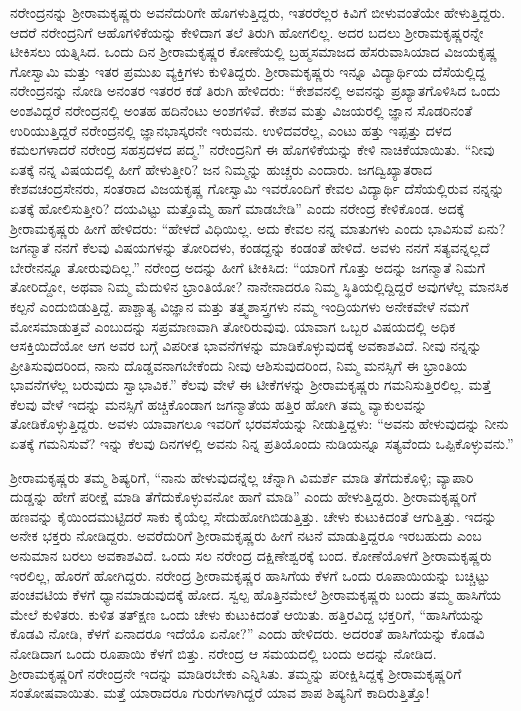 ನರೇಂದ್ರನನ್ನು ಶ‍್ರೀರಾಮಕೃಷ್ಣರು ಅವನೆದುರಿಗೇ ಹೊಗಳುತ್ತಿದ್ದರು, ಇತರರೆಲ್ಲರ ಕಿವಿಗೆ ಬೀಳುವಂತೆಯೇ ಹೇಳುತ್ತಿದ್ದರು. ಆದರೆ ನರೇಂದ್ರನಿಗೆ ಆ\break ಹೊಗಳಿಕೆಯನ್ನು ಕೇಳಿದಾಗ ತಲೆ ತಿರುಗಿ ಹೋಗಲಿಲ್ಲ. ಅದರ ಬದಲು ಶ‍್ರೀರಾಮಕೃಷ್ಣ\-ರನ್ನೇ ಟೀಕಿಸಲು ಯತ್ನಿಸಿದ. ಒಂದು ದಿನ ಶ‍್ರೀರಾಮಕೃಷ್ಣರ ಕೋಣೆಯಲ್ಲಿ ಬ್ರಹ್ಮಸಮಾಜದ ಹೆಸರುವಾಸಿಯಾದ ವಿಜಯಕೃಷ್ಣ ಗೋಸ್ವಾಮಿ ಮತ್ತು ಇತರ ಪ್ರಮುಖ ವ್ಯಕ್ತಿಗಳು ಕುಳಿತಿದ್ದರು. ಶ‍್ರೀರಾಮಕೃಷ್ಣರು ಇನ್ನೂ ವಿದ್ಯಾರ್ಥಿಯ ದೆಸೆಯಲ್ಲಿದ್ದ ನರೇಂದ್ರನನ್ನು ನೋಡಿ ಅನಂತರ ಇತರರ ಕಡೆ ತಿರುಗಿ ಹೇಳಿದರು: “ಕೇಶವನಲ್ಲಿ ಅವನನ್ನು ಪ್ರಖ್ಯಾತಗೊಳಿಸಿದ ಒಂದು ಅಂಶವಿದ್ದರೆ ನರೇಂದ್ರನಲ್ಲಿ ಅಂತಹ ಹದಿನೆಂಟು ಅಂಶಗಳಿವೆ. ಕೇಶವ ಮತ್ತು ವಿಜಯರಲ್ಲಿ ಜ್ಞಾನ ಸೊಡರಿನಂತೆ ಉರಿಯುತ್ತಿದ್ದರೆ ನರೇಂದ್ರನಲ್ಲಿ ಜ್ಞಾನಭಾಸ್ಕರನೇ ಇರುವನು. ಉಳಿದವರೆಲ್ಲ, ಎಂಟು ಹತ್ತು ಇಪ್ಪತ್ತು ದಳದ ಕಮಲಗಳಾದರೆ ನರೇಂದ್ರ ಸಹಸ್ರದಳದ ಪದ್ಮ.” ನರೇಂದ್ರನಿಗೆ ಈ ಹೊಗಳಿಕೆಯನ್ನು ಕೇಳಿ ನಾಚಿಕೆಯಾಯಿತು. “ನೀವು ಏತಕ್ಕೆ ನನ್ನ ವಿಷಯದಲ್ಲಿ ಹೀಗೆ ಹೇಳುತ್ತೀರಿ? ಜನ ನಿಮ್ಮನ್ನು ಹುಚ್ಚರು ಎಂದಾರು. ಜಗದ್ವಿಖ್ಯಾತರಾದ ಕೇಶವಚಂದ್ರಸೇನರು, ಸಂತರಾದ ವಿಜಯಕೃಷ್ಣ ಗೋಸ್ವಾಮಿ ಇವರೊಂದಿಗೆ ಕೇವಲ ವಿದ್ಯಾರ್ಥಿ ದೆಸೆಯಲ್ಲಿರುವ ನನ್ನನ್ನು ಏತಕ್ಕೆ ಹೋಲಿಸುತ್ತೀರಿ? ದಯವಿಟ್ಟು ಮತ್ತೊಮ್ಮೆ ಹಾಗೆ ಮಾಡಬೇಡಿ” ಎಂದು ನರೇಂದ್ರ ಕೇಳಿಕೊಂಡ. ಅದಕ್ಕೆ ಶ‍್ರೀರಾಮಕೃಷ್ಣರು ಹೀಗೆ ಹೇಳಿದರು: “ಹೇಳದೆ ವಿಧಿಯಿಲ್ಲ. ಅದು ಕೇವಲ ನನ್ನ ಮಾತುಗಳು ಎಂದು ಭಾವಿಸುವೆ ಏನು? ಜಗನ್ಮಾತೆ ನನಗೆ ಕೆಲವು ವಿಷಯಗಳನ್ನು ತೋರಿದಳು, ಕಂಡದ್ದನ್ನು ಕಂಡಂತೆ ಹೇಳಿದೆ. ಅವಳು ನನಗೆ ಸತ್ಯವನ್ನಲ್ಲದೆ ಬೇರೇನನ್ನೂ ತೋರುವುದಿಲ್ಲ.” ನರೇಂದ್ರ ಅದನ್ನು ಹೀಗೆ ಟೀಕಿಸಿದ: “ಯಾರಿಗೆ ಗೊತ್ತು ಅದನ್ನು ಜಗನ್ಮಾತೆ ನಿಮಗೆ ತೋರಿದ್ದೋ, ಅಥವಾ ನಿಮ್ಮ ಮೆದುಳಿನ ಭ್ರಾಂತಿಯೋ? ನಾನೇನಾದರೂ ನಿಮ್ಮ ಸ್ಥಿತಿಯಲ್ಲಿದ್ದಿದ್ದರೆ ಅವುಗಳೆಲ್ಲ ಮಾನಸಿಕ ಕಲ್ಪನೆ ಎಂದುಬಿಡುತ್ತಿದ್ದೆ. ಪಾಶ್ಚಾತ್ಯ ವಿಜ್ಞಾನ ಮತ್ತು ತತ್ತ್ವಶಾಸ್ತ್ರಗಳು ನಮ್ಮ ಇಂದ್ರಿಯಗಳು ಅನೇಕವೇಳೆ ನಮಗೆ ಮೋಸಮಾಡುತ್ತವೆ ಎಂಬುದನ್ನು ಸಪ್ರಮಾಣವಾಗಿ ತೋರಿರುವುವು. ಯಾವಾಗ ಒಬ್ಬರ ವಿಷಯದಲ್ಲಿ ಅಧಿಕ ಆಸಕ್ತಿಯಿದೆಯೋ ಆಗ ಅವರ ಬಗ್ಗೆ ವಿಪರೀತ ಭಾವನೆಗಳನ್ನು ಮಾಡಿಕೊಳ್ಳುವುದಕ್ಕೆ ಅವಕಾಶವಿದೆ. ನೀವು ನನ್ನನ್ನು ಪ್ರೀತಿಸುವುದರಿಂದ, ನಾನು ದೊಡ್ಡವನಾಗಬೇಕೆಂದು ನೀವು ಆಶಿಸುವುದರಿಂದ, ನಿಮ್ಮ ಮನಸ್ಸಿಗೆ ಈ ಭ್ರಾಂತಿಯ ಭಾವನೆಗಳೆಲ್ಲ ಬರುವುದು ಸ್ವಾಭಾವಿಕ.” ಕೆಲವು ವೇಳೆ ಈ ಟೀಕೆಗಳನ್ನು ಶ‍್ರೀರಾಮಕೃಷ್ಣರು ಗಮನಿಸುತ್ತಿರಲಿಲ್ಲ. ಮತ್ತೆ ಕೆಲವು ವೇಳೆ ಇದನ್ನು ಮನಸ್ಸಿಗೆ ಹಚ್ಚಿಕೊಂಡಾಗ ಜಗನ್ಮಾತೆಯ ಹತ್ತಿರ ಹೋಗಿ ತಮ್ಮ ವ್ಯಾಕುಲವನ್ನು ತೋಡಿಕೊಳ್ಳುತ್ತಿದ್ದರು. ಅವಳು ಯಾವಾಗಲೂ ಇವರಿಗೆ ಭರವಸೆಯನ್ನು ನೀಡುತ್ತಿದ್ದಳು: “ಅವನು ಹೇಳುವುದನ್ನು ನೀನು ಏತಕ್ಕೆ ಗಮನಿಸುವೆ? ಇನ್ನು ಕೆಲವು ದಿನಗಳಲ್ಲಿ ಅವನು ನಿನ್ನ ಪ್ರತಿಯೊಂದು ನುಡಿಯನ್ನೂ ಸತ್ಯವೆಂದು ಒಪ್ಪಿಕೊಳ್ಳುವನು.”

ಶ‍್ರೀರಾಮಕೃಷ್ಣರು ತಮ್ಮ ಶಿಷ್ಯರಿಗೆ, “ನಾನು ಹೇಳುವುದನ್ನೆಲ್ಲ ಚೆನ್ನಾಗಿ ವಿಮರ್ಶೆ ಮಾಡಿ ತೆಗೆದುಕೊಳ್ಳಿ; ವ್ಯಾಪಾರಿ ದುಡ್ಡನ್ನು ಹೇಗೆ ಪರೀಕ್ಷೆ ಮಾಡಿ ತೆಗೆದುಕೊಳ್ಳುವನೋ ಹಾಗೆ ಮಾಡಿ” ಎಂದು ಹೇಳುತ್ತಿದ್ದರು. ಶ‍್ರೀರಾಮಕೃಷ್ಣರಿಗೆ ಹಣವನ್ನು ಕೈಯಿಂದ\break ಮುಟ್ಟಿದರೆ ಸಾಕು ಕೈಯೆಲ್ಲ ಸೇದುಹೋಗಿಬಿಡುತ್ತಿತ್ತು. ಚೇಳು ಕುಟುಕಿದಂತೆ ಆಗುತ್ತಿತ್ತು. ಇದನ್ನು ಅನೇಕ ಭಕ್ತರು ನೋಡಿದ್ದರು. ಅವರೆದುರಿಗೆ ಶ‍್ರೀರಾಮಕೃಷ್ಣರು ಹೀಗೆ ನಟನೆ ಮಾಡುತ್ತಿದ್ದರೂ ಇರಬಹುದು ಎಂಬ ಅನುಮಾನ ಬರಲು ಅವಕಾಶವಿದೆ. ಒಂದು ಸಲ ನರೇಂದ್ರ ದಕ್ಷಿಣೇಶ್ವರಕ್ಕೆ ಬಂದ. ಕೋಣೆಯೊಳಗೆ ಶ‍್ರೀರಾಮಕೃಷ್ಣರು ಇರಲಿಲ್ಲ, ಹೊರಗೆ ಹೋಗಿದ್ದರು. ನರೇಂದ್ರ ಶ‍್ರೀರಾಮಕೃಷ್ಣರ ಹಾಸಿಗೆಯ ಕೆಳಗೆ ಒಂದು ರೂಪಾಯಿಯನ್ನು ಬಚ್ಚಿಟ್ಟು ಪಂಚವಟಿಯ ಕೆಳಗೆ ಧ್ಯಾನಮಾಡುವುದಕ್ಕೆ ಹೋದ. ಸ್ವಲ್ಪ ಹೊತ್ತಿನಮೇಲೆ ಶ‍್ರೀರಾಮಕೃಷ್ಣರು ಬಂದು ತಮ್ಮ ಹಾಸಿಗೆಯ ಮೇಲೆ ಕುಳಿತರು. ಕುಳಿತ ತತ್‍ಕ್ಷಣ ಒಂದು ಚೇಳು ಕುಟುಕಿದಂತೆ ಆಯಿತು. ಹತ್ತಿರವಿದ್ದ ಭಕ್ತರಿಗೆ, “ಹಾಸಿಗೆಯನ್ನು ಕೊಡವಿ ನೋಡಿ, ಕೆಳಗೆ ಏನಾದರೂ ಇದೆಯೊ ಏನೋ?” ಎಂದು ಹೇಳಿದರು. ಅದರಂತೆ ಹಾಸಿಗೆಯನ್ನು ಕೊಡವಿ ನೋಡಿದಾಗ ಒಂದು ರೂಪಾಯಿ ಕೆಳಗೆ ಬಿತ್ತು. ನರೇಂದ್ರ ಆ ಸಮಯದಲ್ಲಿ ಬಂದು ಅದನ್ನು ನೋಡಿದ. ಶ‍್ರೀರಾಮಕೃಷ್ಣರಿಗೆ ನರೇಂದ್ರನೇ ಇದನ್ನು ಮಾಡಿರಬೇಕು ಎನ್ನಿಸಿತು. ತಮ್ಮನ್ನು ಪರೀಕ್ಷಿಸಿದ್ದಕ್ಕೆ ಶ‍್ರೀರಾಮಕೃಷ್ಣರಿಗೆ ಸಂತೋಷವಾಯಿತು. ಮತ್ತೆ ಯಾರಾದರೂ ಗುರುಗಳಾಗಿದ್ದರೆ ಯಾವ ಶಾಪ ಶಿಷ್ಯನಿಗೆ ಕಾದಿರುತ್ತಿತ್ತೊ!

